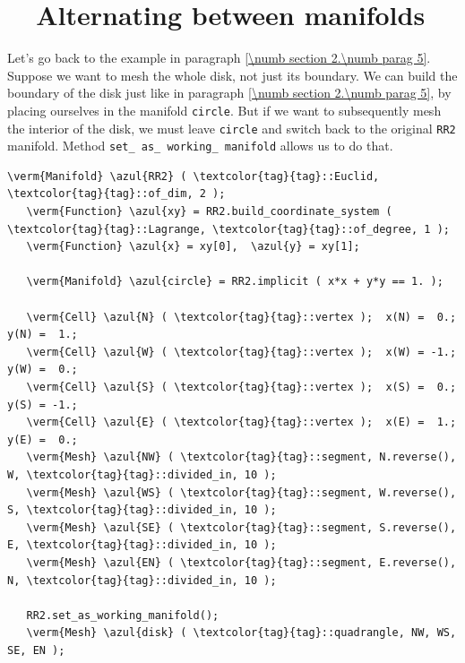 \section{~~Alternating between manifolds}\label{\numb section 2.\numb parag 9}

Let's go back to the example in paragraph \ref{\numb section 2.\numb parag 5}.
Suppose we want to mesh the whole disk, not just its boundary.
We can build the boundary of the disk just like in paragraph
\ref{\numb section 2.\numb parag 5}, by placing ourselves in the manifold {\small\tt circle}.
But if we want to subsequently mesh the interior of the disk, we must leave {\small\tt circle}
and switch back to the original {\small\tt RR2} manifold.
Method {\small\tt set\_\,as\_\,working\_\,manifold} allows us to do that.

\begin{Verbatim}[commandchars=\\\{\},formatcom=\small\tt,frame=single,
   label=parag-\ref{\numb section 2.\numb parag 9}.cpp,rulecolor=\color{coment},
   baselinestretch=0.94,framesep=2mm]
   \verm{Manifold} \azul{RR2} ( \textcolor{tag}{tag}::Euclid, \textcolor{tag}{tag}::of_dim, 2 );
   \verm{Function} \azul{xy} = RR2.build_coordinate_system ( \textcolor{tag}{tag}::Lagrange, \textcolor{tag}{tag}::of_degree, 1 );
   \verm{Function} \azul{x} = xy[0],  \azul{y} = xy[1];
   
   \verm{Manifold} \azul{circle} = RR2.implicit ( x*x + y*y == 1. );
   
   \verm{Cell} \azul{N} ( \textcolor{tag}{tag}::vertex );  x(N) =  0.;   y(N) =  1.;
   \verm{Cell} \azul{W} ( \textcolor{tag}{tag}::vertex );  x(W) = -1.;   y(W) =  0.;
   \verm{Cell} \azul{S} ( \textcolor{tag}{tag}::vertex );  x(S) =  0.;   y(S) = -1.;
   \verm{Cell} \azul{E} ( \textcolor{tag}{tag}::vertex );  x(E) =  1.;   y(E) =  0.;
   \verm{Mesh} \azul{NW} ( \textcolor{tag}{tag}::segment, N.reverse(), W, \textcolor{tag}{tag}::divided_in, 10 );
   \verm{Mesh} \azul{WS} ( \textcolor{tag}{tag}::segment, W.reverse(), S, \textcolor{tag}{tag}::divided_in, 10 );
   \verm{Mesh} \azul{SE} ( \textcolor{tag}{tag}::segment, S.reverse(), E, \textcolor{tag}{tag}::divided_in, 10 );
   \verm{Mesh} \azul{EN} ( \textcolor{tag}{tag}::segment, E.reverse(), N, \textcolor{tag}{tag}::divided_in, 10 );
   
   RR2.set_as_working_manifold();
   \verm{Mesh} \azul{disk} ( \textcolor{tag}{tag}::quadrangle, NW, WS, SE, EN );
\end{Verbatim}

